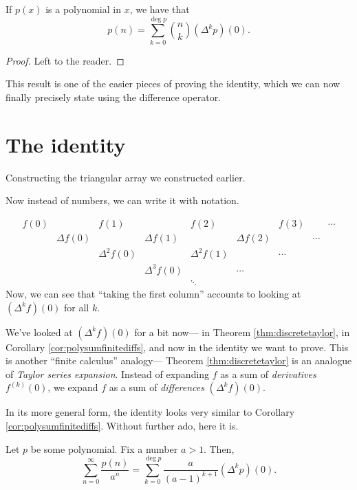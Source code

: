 \documentclass{article}
\DeclareMathOperator{\degree}{deg}
\begin{document}
\begin{corollary}\label{cor:polysumfinitediffs}
    If $p(x)$ is a polynomial in $x$, we have that
    \[
        p(n) = \sum_{k=0}^{\degree p}\binom{n}{k}(\Delta^kp)(0).
    \]
\end{corollary}

\begin{proof}
    Left to the reader.
\end{proof}

This result is one of the easier pieces of proving the identity, which we can now finally precisely state using the difference operator.

\section{The identity}

Constructing the triangular array we constructed earlier.

Now instead of numbers, we can write it with notation.

\[
    \begin{matrix}
        f(0) && f(1) && f(2) && f(3) && \cdots \\
             &  \Delta f(0) && \Delta f(1) && \Delta f(2) && \cdots \\
             && \Delta^2 f(0) && \Delta^2 f(1) && \cdots \\
             && & \Delta^3 f(0) && \cdots \\
             &&&& \ddots
    \end{matrix}
\]
Now, we can see that ``taking the first column'' accounts to looking at $(\Delta^k f)(0)$ for all $k$. 

We've looked at $(\Delta^k f)(0)$ for a bit now--- in Theorem \ref{thm:discretetaylor}, in Corollary \ref{cor:polysumfinitediffs}, and now in the identity we want to prove. This is another ``finite calculus'' analogy--- Theorem \ref{thm:discretetaylor} is an analogue of \textit{Taylor series expansion}.
Instead of expanding $f$ as a sum of \textit{derivatives} $f^{(k)}(0)$, we expand $f$ as a sum of \textit{differences} $(\Delta^k f)(0)$.

In its more general form, the identity looks very similar to Corollary \ref{cor:polysumfinitediffs}.
Without further ado, here it is.

\begin{theorem}\label{thm:thethm}
    Let $p$ be some polynomial.
    Fix a number $a > 1$.
    Then,
    \[
        \sum_{n=0}^\infty \frac{p(n)}{a^n} = \sum_{k=0}^{\degree p} \frac{a}{(a-1)^{k+1}} (\Delta^k p)(0).
    \]
\end{theorem}
\end{document}
